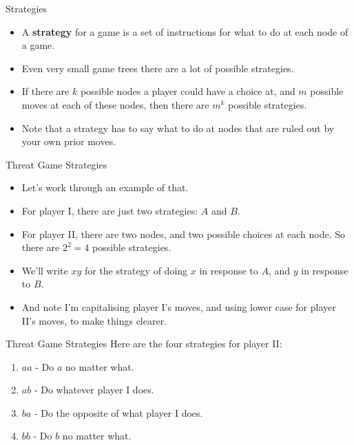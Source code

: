 \documentclass[
  ignorenonframetext,
]{beamer}
\providecommand{\tightlist}{%
  \setlength{\itemsep}{0pt}\setlength{\parskip}{0pt}}
\begin{document}
\begin{frame}{Strategies}
\protect\hypertarget{strategies}{}
\begin{itemize}
\tightlist
\item
  A \textbf{strategy} for a game is a set of instructions for what to do
  at each node of a game.
\item
  Even very small game trees there are a lot of possible strategies.
\item
  If there are \(k\) possible nodes a player could have a choice at, and
  \(m\) possible moves at each of these nodes, then there are \(m^k\)
  possible strategies.
\item
  Note that a strategy has to say what to do at nodes that are ruled out
  by your own prior moves.
\end{itemize}
\end{frame}

\begin{frame}{Threat Game Strategies}
\protect\hypertarget{threat-game-strategies}{}
\begin{itemize}
\tightlist
\item
  Let's work through an example of that.
\item
  For player I, there are just two strategies: \(A\) and \(B\).
\item
  For player II, there are two nodes, and two possible choices at each
  node. So there are \(2^2 = 4\) possible strategies.
\item
  We'll write \(xy\) for the strategy of doing \(x\) in response to
  \(A\), and \(y\) in response to \(B\).
\item
  And note I'm capitalising player I's moves, and using lower case for
  player II's moves, to make things clearer.
\end{itemize}
\end{frame}

\begin{frame}{Threat Game Strategies}
\protect\hypertarget{threat-game-strategies-1}{}
Here are the four strategies for player II:

\begin{enumerate}
\tightlist
\item
  \(aa\) - Do \(a\) no matter what.
\item
  \(ab\) - Do whatever player I does.
\item
  \(ba\) - Do the opposite of what player I does.
\item
  \(bb\) - Do \(b\) no matter what.
\end{enumerate}
\end{frame}
\end{document}
